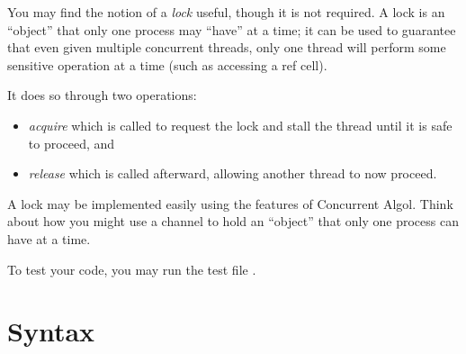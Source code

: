 \documentclass[11pt]{article}
\begin{document}
\begin{hint}
  You may find the notion of a \emph{lock} useful, though it is not required.
  A lock is an ``object'' that only one process may ``have'' at a time; it can be used to guarantee that even given multiple concurrent threads, only one thread will perform some sensitive operation at a time (such as accessing a ref cell).

  It does so through two operations:
  \begin{itemize}
    \item \emph{acquire} which is called to request the lock and stall the thread until it is safe to proceed, and
    \item \emph{release} which is called afterward, allowing another thread to now proceed.
  \end{itemize}
\end{hint}
\begin{hint}
  A lock may be implemented easily using the features of Concurrent Algol.
  Think about how you might use a channel to hold an ``object'' that only one process can have at a time.
\end{hint}


To test your code, you may run the test file .


\appendix

\section{Syntax}
\label{section:concrete-syntax}
\end{document}
